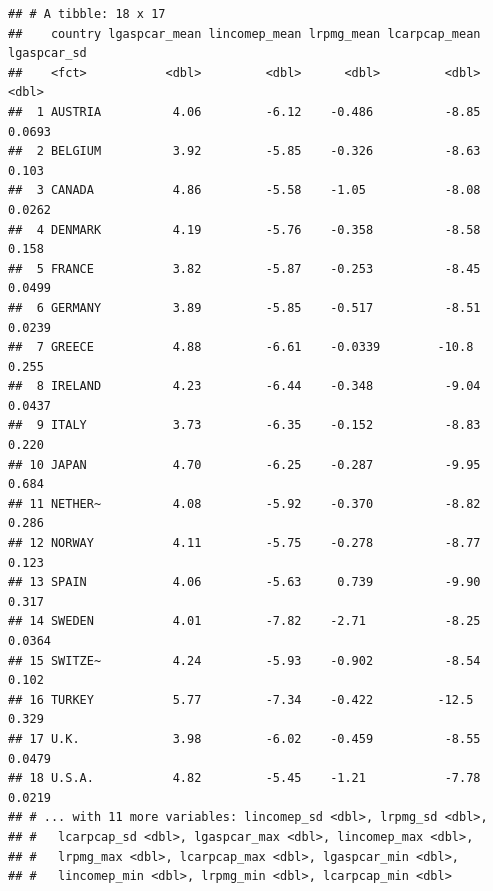 \documentclass[]{gitbook}
\newenvironment{Shaded}{\begin{snugshade}}{\end{snugshade}}
\newcommand{\KeywordTok}[1]{\textcolor[rgb]{0.13,0.29,0.53}{\textbf{#1}}}
\newcommand{\NormalTok}[1]{#1}
\newcommand{\OperatorTok}[1]{\textcolor[rgb]{0.81,0.36,0.00}{\textbf{#1}}}
\newcommand{\StringTok}[1]{\textcolor[rgb]{0.31,0.60,0.02}{#1}}
\theoremstyle{definition}
\theoremstyle{definition}
\theoremstyle{definition}
\theoremstyle{remark}
\begin{document}
\begin{Shaded}
\end{Shaded}

\begin{verbatim}
## # A tibble: 18 x 17
##    country lgaspcar_mean lincomep_mean lrpmg_mean lcarpcap_mean lgaspcar_sd
##    <fct>           <dbl>         <dbl>      <dbl>         <dbl>       <dbl>
##  1 AUSTRIA          4.06         -6.12    -0.486          -8.85      0.0693
##  2 BELGIUM          3.92         -5.85    -0.326          -8.63      0.103 
##  3 CANADA           4.86         -5.58    -1.05           -8.08      0.0262
##  4 DENMARK          4.19         -5.76    -0.358          -8.58      0.158 
##  5 FRANCE           3.82         -5.87    -0.253          -8.45      0.0499
##  6 GERMANY          3.89         -5.85    -0.517          -8.51      0.0239
##  7 GREECE           4.88         -6.61    -0.0339        -10.8       0.255 
##  8 IRELAND          4.23         -6.44    -0.348          -9.04      0.0437
##  9 ITALY            3.73         -6.35    -0.152          -8.83      0.220 
## 10 JAPAN            4.70         -6.25    -0.287          -9.95      0.684 
## 11 NETHER~          4.08         -5.92    -0.370          -8.82      0.286 
## 12 NORWAY           4.11         -5.75    -0.278          -8.77      0.123 
## 13 SPAIN            4.06         -5.63     0.739          -9.90      0.317 
## 14 SWEDEN           4.01         -7.82    -2.71           -8.25      0.0364
## 15 SWITZE~          4.24         -5.93    -0.902          -8.54      0.102 
## 16 TURKEY           5.77         -7.34    -0.422         -12.5       0.329 
## 17 U.K.             3.98         -6.02    -0.459          -8.55      0.0479
## 18 U.S.A.           4.82         -5.45    -1.21           -7.78      0.0219
## # ... with 11 more variables: lincomep_sd <dbl>, lrpmg_sd <dbl>,
## #   lcarpcap_sd <dbl>, lgaspcar_max <dbl>, lincomep_max <dbl>,
## #   lrpmg_max <dbl>, lcarpcap_max <dbl>, lgaspcar_min <dbl>,
## #   lincomep_min <dbl>, lrpmg_min <dbl>, lcarpcap_min <dbl>
\end{verbatim}
\end{document}
